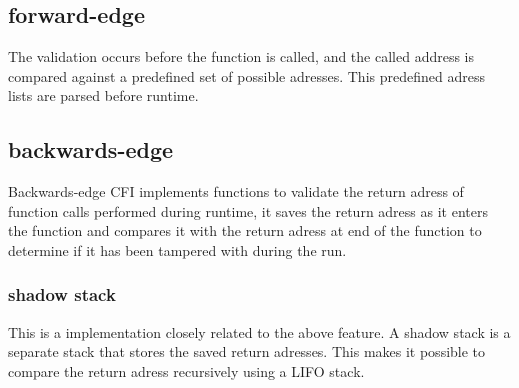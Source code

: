 \documentclass[11pt]{article}
\begin{document}
\subsection*{forward-edge}
The validation occurs before the function is called, and the called address is compared against a predefined set of possible adresses. This predefined adress lists are parsed before runtime.
\subsection*{backwards-edge}
Backwards-edge CFI implements functions to validate the return adress of function calls performed during runtime, it saves the return adress as it enters the function and compares it with the return adress at end of the function to determine if it has been tampered with during the run. 
\newpage
\subsubsection*{shadow stack}
This is a implementation closely related to the above feature. A shadow stack is a separate stack that stores the saved return adresses. This makes it possible to compare the return adress recursively using a LIFO stack. 
\end{document}
